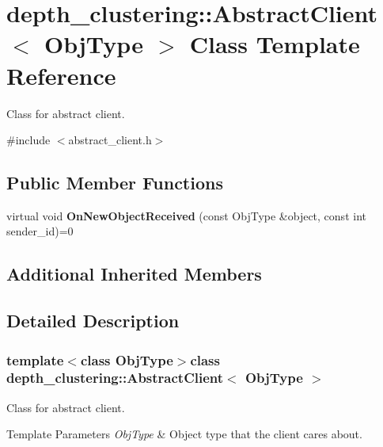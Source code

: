 \hypertarget{classdepth__clustering_1_1AbstractClient}{\section{depth\-\_\-clustering\-:\-:Abstract\-Client$<$ Obj\-Type $>$ Class Template Reference}
\label{classdepth__clustering_1_1AbstractClient}
}


Class for abstract client.  




{\ttfamily \#include $<$abstract\-\_\-client.\-h$>$}

\subsection*{Public Member Functions}
\begin{DoxyCompactItemize}
\item 
\hypertarget{classdepth__clustering_1_1AbstractClient_ad5eedf7017e6c6de4f5741334d6d53ad}{virtual void {\bfseries On\-New\-Object\-Received} (const Obj\-Type \&object, const int sender\-\_\-id)=0}\label{classdepth__clustering_1_1AbstractClient_ad5eedf7017e6c6de4f5741334d6d53ad}

\end{DoxyCompactItemize}
\subsection*{Additional Inherited Members}


\subsection{Detailed Description}
\subsubsection*{template$<$class Obj\-Type$>$class depth\-\_\-clustering\-::\-Abstract\-Client$<$ Obj\-Type $>$}

Class for abstract client. 


\begin{DoxyTemplParams}{Template Parameters}
{\em Obj\-Type} & Object type that the client cares about. \\
\hline
\end{DoxyTemplParams}



